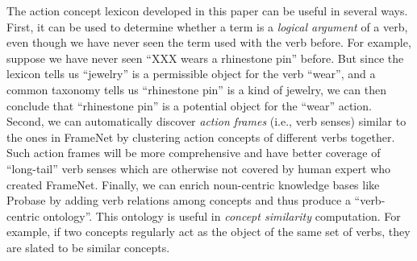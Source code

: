 The action concept lexicon developed in this paper can be useful
in several ways.
First, it can be used to determine whether a term is a {\em logical
argument} of a verb, even though we have never seen the term used with
the verb before. For example, suppose we have never seen ``XXX wears
a rhinestone pin'' before. But since the lexicon tells us ``jewelry'' is a permissible
object for the verb ``wear'', and a common taxonomy tells us ``rhinestone pin''
is a kind of jewelry, we can then conclude that ``rhinestone pin'' is a potential
object for the ``wear'' action.
Second, we can automatically discover {\em action frames} (i.e., verb senses)
similar to the ones in FrameNet by clustering action concepts of
different verbs together. Such action frames will be more
comprehensive and have
better coverage of ``long-tail'' verb senses which are otherwise not
covered by human expert who created FrameNet.
Finally, we can enrich noun-centric knowledge bases like
Probase by adding verb relations among concepts and thus produce a
``verb-centric ontology''. This ontology is useful in
{\em concept similarity} computation.
For example, if two concepts regularly act as the
object of the same set of verbs, they are slated to be similar concepts.

